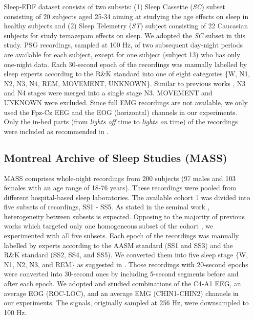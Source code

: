 \documentclass[10pt,twocolumn,twoside]{IEEEtran}
\begin{document}
Sleep-EDF dataset \cite{Kemp2000, Goldberger2000} consists of two subsets: (1) Sleep Cassette (\emph{SC}) subset consisting of 20 subjects aged 25-34  aiming at studying the age effects on sleep in healthy subjects and (2) Sleep Telemetry (\emph{ST}) subject consisting of 22 Caucasian subjects for study temazepam effects on sleep. We adopted the \emph{SC} subset in this study. PSG recordings, sampled at 100 Hz, of two subsequent day-night periods are available for each subject, except for one subject (subject 13) who has only one-night data. Each 30-second epoch of the recordings was manually labelled by sleep experts according to the R\&K standard \cite{Hobson1969} into one of eight categories \{W, N1, N2, N3, N4, REM, MOVEMENT, UNKNOWN\}. Similar to previous works \cite{Tsinalis2016, Tsinalis2016b, Supratak2017}, N3 and N4 stages were merged into a single stage N3. MOVEMENT and UNKNOWN were excluded. Since full EMG recordings are not available, we only used the Fpz-Cz EEG and the EOG (horizontal) channels in our experiments. Only the in-bed parts (from \emph{lights off} time to \emph{lights on} time) of the recordings were included as recommended in \cite{Imtiaz2014,Imtiaz2015,Tsinalis2016, Tsinalis2016b}.

\subsection{Montreal Archive of Sleep Studies (MASS)}

MASS comprises whole-night recordings from 200 subjects (97 males and 103 females with an age range of 18-76 years). 
These recordings were pooled from different hospital-based sleep laboratories. The available cohort 1 was divided into five subsets of recordings, SS1 - SS5. As stated in the seminal work \cite{Oreilly2014}, heterogeneity between subsets is expected. 
Opposing to the majority of previous works which targeted only one homogeneous subset of the cohort \cite{Dong2017, Supratak2017}, we experimented with all five subsets. Each epoch of the recordings was manually labelled by experts  according to the AASM standard \cite{Iber2007} (SS1 and SS3) and the R\&K standard \cite{Hobson1969}  (SS2, SS4, and SS5). We converted them into five sleep stage \{W, N1, N2, N3, and REM\} as suggested in \cite{Imtiaz2014,Imtiaz2015}. Those recordings with 20-second epochs were converted into 30-second ones by including 5-second segments before and after each epoch. We adopted and studied combinations of the C4-A1 EEG, an average EOG (ROC-LOC), and an average EMG (CHIN1-CHIN2) channels in our experiments. The signals, originally sampled at 256 Hz, were downsampled to 100 Hz. 
\end{document}
